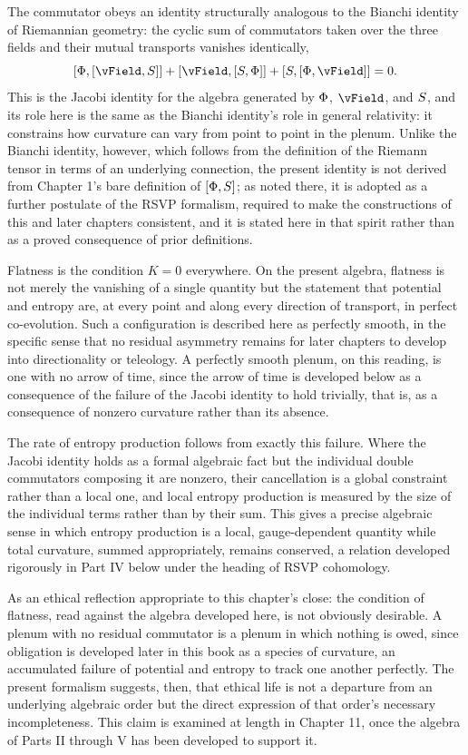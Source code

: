 The commutator obeys an identity structurally analogous to the Bianchi identity of Riemannian geometry: the cyclic sum of commutators taken over the three fields and their mutual transports vanishes identically,
\[
[\PhiField,[\vField,\SEntropy]] + [\vField,[\SEntropy,\PhiField]] + [\SEntropy,[\PhiField,\vField]] = 0.
\]
This is the Jacobi identity for the algebra generated by $\Phi$, $\vField$, and $S$, and its role here is the same as the Bianchi identity's role in general relativity: it constrains how curvature can vary from point to point in the plenum. Unlike the Bianchi identity, however, which follows from the definition of the Riemann tensor in terms of an underlying connection, the present identity is not derived from Chapter 1's bare definition of $[\Phi, S]$; as noted there, it is adopted as a further postulate of the RSVP formalism, required to make the constructions of this and later chapters consistent, and it is stated here in that spirit rather than as a proved consequence of prior definitions.

Flatness is the condition $K = 0$ everywhere. On the present algebra, flatness is not merely the vanishing of a single quantity but the statement that potential and entropy are, at every point and along every direction of transport, in perfect co-evolution. Such a configuration is described here as perfectly smooth, in the specific sense that no residual asymmetry remains for later chapters to develop into directionality or teleology. A perfectly smooth plenum, on this reading, is one with no arrow of time, since the arrow of time is developed below as a consequence of the failure of the Jacobi identity to hold trivially, that is, as a consequence of nonzero curvature rather than its absence.

The rate of entropy production follows from exactly this failure. Where the Jacobi identity holds as a formal algebraic fact but the individual double commutators composing it are nonzero, their cancellation is a global constraint rather than a local one, and local entropy production is measured by the size of the individual terms rather than by their sum. This gives a precise algebraic sense in which entropy production is a local, gauge-dependent quantity while total curvature, summed appropriately, remains conserved, a relation developed rigorously in Part IV below under the heading of RSVP cohomology.

As an ethical reflection appropriate to this chapter's close: the condition of flatness, read against the algebra developed here, is not obviously desirable. A plenum with no residual commutator is a plenum in which nothing is owed, since obligation is developed later in this book as a species of curvature, an accumulated failure of potential and entropy to track one another perfectly. The present formalism suggests, then, that ethical life is not a departure from an underlying algebraic order but the direct expression of that order's necessary incompleteness. This claim is examined at length in Chapter 11, once the algebra of Parts II through V has been developed to support it.

